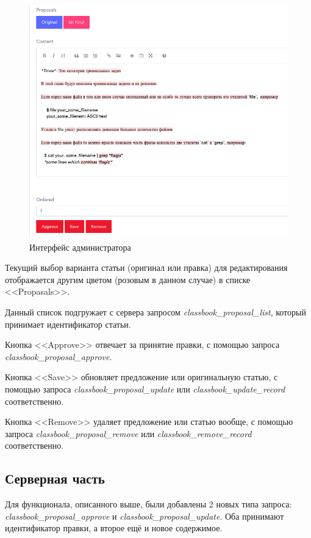 \begin{figure}[!h]
    \centering
    \includegraphics[width=0.6\linewidth]{images/admin_web_editing.png}
    \caption{Интерфейс администратора}
    \label{fig:admin_web_editing}
\end{figure}

Текущий выбор варианта статьи (оригинал или правка) для
редактирования отображается другим цветом (розовым в данном случае) в списке <<Propasals>>.

Данный список подгружает с сервера запросом \emph{classbook\_proposal\_list}, который принимает идентификатор статьи.

Кнопка <<Approve>> отвечает за принятие правки, с помощью запроса \emph{classbook\_proposal\_approve}.

Кнопка <<Save>> обновляет предложение или оригинальную статью, с помощью запроса \emph{classbook\_proposal\_update} или \emph{classbook\_update\_record} соответственно.

Кнопка <<Remove>> удаляет предложение или статью вообще, с помощью запроса \emph{classbook\_proposal\_remove} или \emph{classbook\_remove\_record} соответственно.

\vspace{2em}

\subsection{Серверная часть}

\vspace{1em}

Для функционала, описанного выше, были добавлены 2 новых типа запроса: \\ 
\emph{classbook\_proposal\_approve} и \emph{classbook\_proposal\_update}.
Оба принимают идентификатор правки, а второе ещё и новое содержимое.

